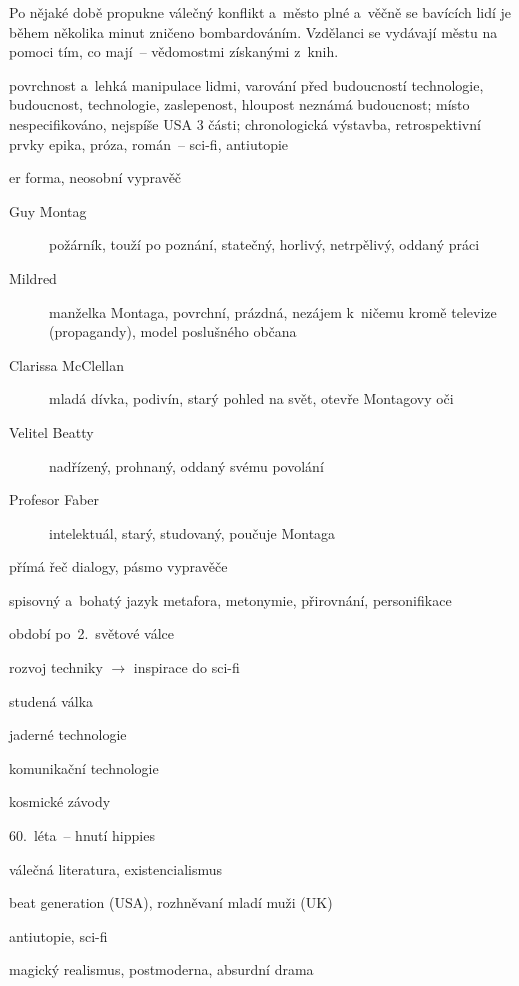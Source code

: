 {Po nějaké době propukne válečný konflikt a~město plné 
a~věčně se bavících lidí je během několika minut zničeno bombardováním.
Vzdělanci se vydávají městu na pomoci tím, co mají~-- vědomostmi získanými
z~knih.


povrchnost a~lehká manipulace lidmi, varování před budoucností technologie, budoucnost, technologie, zaslepenost, hloupost
neznámá budoucnost; místo nespecifikováno, nejspíše USA
3 části; chronologická výstavba, retrospektivní prvky
epika, próza, román~-- sci-fi, antiutopie
\newpart

er forma, neosobní vypravěč
\begin{description}
	\item [Guy Montag] požárník, touží po poznání, statečný, horlivý, netrpělivý, oddaný práci
	\item [Mildred] manželka Montaga, povrchní, prázdná, nezájem k~ničemu kromě televize (propagandy), model poslušného občana
	\item [Clarissa McClellan] mladá dívka, podivín, starý pohled na svět, otevře Montagovy oči
	\item [Velitel Beatty] nadřízený, prohnaný, oddaný svému povolání
	\item [Profesor Faber] intelektuál, starý, studovaný, poučuje Montaga
\end{description}

přímá řeč
dialogy, pásmo vypravěče

\newpart

spisovný a~bohatý jazyk
metafora, metonymie, přirovnání, personifikace

\begin{compactitem}
	\item období po~2.~světové válce
	\item rozvoj techniky $\rightarrow$ inspirace do sci-fi
	\begin{compactitem}
		\item studená válka
		\item jaderné technologie
		\item komunikační technologie
		\item kosmické závody
	\end{compactitem}
	\item 60.~léta~-- hnutí hippies
	\item válečná literatura, existencialismus
	\item beat generation (USA), rozhněvaní mladí muži (UK)
	\item antiutopie, sci-fi
	\item magický realismus, postmoderna, absurdní drama
\end{compactitem}

}
